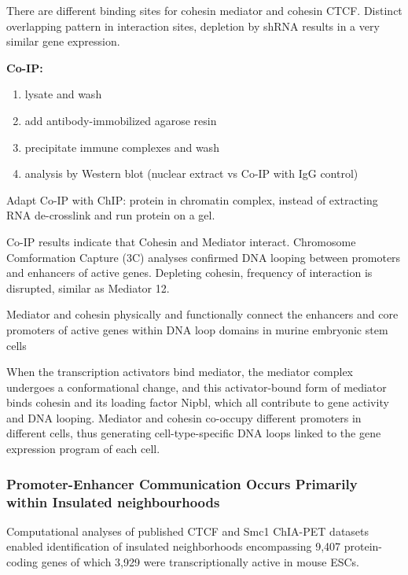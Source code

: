 There are different binding sites for cohesin mediator and cohesin CTCF. Distinct overlapping pattern in interaction sites, depletion by shRNA results in a very similar gene expression.

\textbf{Co-IP:}

\begin{enumerate}
\def\labelenumi{\arabic{enumi}.}
\tightlist
\item
  lysate and wash
\item
  add antibody-immobilized agarose resin
\item
  precipitate immune complexes and wash
\item
  analysis by Western blot (nuclear extract vs Co-IP with IgG control)
\end{enumerate}

Adapt Co-IP with ChIP: protein in chromatin complex, instead of extracting RNA de-crosslink and run protein on a gel.

Co-IP results indicate that Cohesin and Mediator interact. Chromosome Comformation Capture (3C) analyses confirmed DNA looping between promoters and enhancers of active genes. Depleting cohesin, frequency of interaction is disrupted, similar as Mediator 12.

Mediator and cohesin physically and functionally connect the enhancers and core
promoters of active genes within DNA loop domains in murine embryonic stem cells

When the transcription activators bind mediator, the mediator complex undergoes a conformational change, and this activator-bound form of mediator binds cohesin and its loading factor Nipbl, which all contribute to gene activity and DNA looping. Mediator and cohesin co-occupy different promoters in different cells, thus generating cell-type-specific DNA loops linked to the gene expression program of each cell.

\hypertarget{promoter-enhancer-communication-occurs-primarily-within-insulated-neighbourhoods}{%
\subsubsection{Promoter-Enhancer Communication Occurs Primarily within Insulated neighbourhoods}\label{promoter-enhancer-communication-occurs-primarily-within-insulated-neighbourhoods}}

Computational analyses of published CTCF and Smc1 ChIA-PET datasets enabled identification of insulated neighborhoods encompassing 9,407 protein-coding genes of which 3,929 were transcriptionally active in mouse ESCs.

